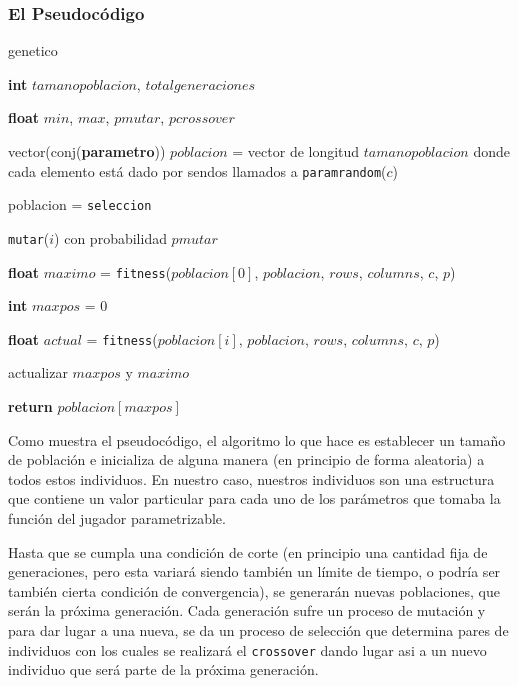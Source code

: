 \documentclass[A4paper,oneside,fleqn,11pt]{article}
\theoremstyle{definition}
\begin{document}
\subsubsection{El Pseudocódigo}
\begin{algorithm}


 


\caption{genetico}

	\textbf{int} $tamanopoblacion$, $totalgeneraciones$

	\textbf{float} $min$, $max$, $pmutar$, $pcrossover$

	vector(conj(\textbf{parametro})) $poblacion$ = vector de longitud $tamanopoblacion$ donde cada elemento está dado por sendos llamados a \texttt{paramrandom}($c$)

	\For{$generacion = [1..totalgeneraciones$)}
		{

		poblacion = \texttt{seleccion}

			{
			\texttt{mutar}($i$) con probabilidad $pmutar$
			}
		}

	\textbf{float} $maximo$ = \texttt{fitness}($poblacion[0]$, $poblacion$, $rows$, $columns$, $c$, $p$)

	\textbf{int} $maxpos$ = 0

	\For{\textbf{int} $i$ = [1..$poblacion$)}
		{

		\textbf{float} $actual$ = \texttt{fitness}($poblacion[i]$, $poblacion$, $rows$, $columns$, $c$, $p$)

			{

			actualizar $maxpos$ y $maximo$
			}
		}

	\textbf{return} $poblacion[maxpos]$

\end{algorithm}

Como muestra el pseudocódigo, el algoritmo lo que hace es establecer un tamaño de población e inicializa de alguna manera (en principio de forma aleatoria) a todos estos individuos. En nuestro caso, nuestros individuos son una estructura que contiene un valor particular para cada uno de los parámetros que tomaba la función del jugador parametrizable.

Hasta que se cumpla una condición de corte (en principio una cantidad fija de generaciones, pero esta variará siendo también un límite de tiempo, o podría ser también cierta condición de convergencia), se generarán nuevas poblaciones, que serán la próxima generación. Cada generación sufre un proceso de mutación y para dar lugar a una nueva, se da un proceso de selección que determina pares de individuos con los cuales se realizará el \texttt{crossover} dando lugar asi a un nuevo individuo que será parte de la próxima generación.
\end{document}
